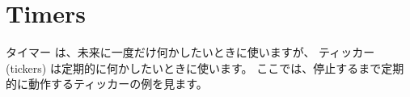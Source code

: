 \section{Timers}

タイマー は、未来に一度だけ何かしたいときに使いますが、 ティッカー (tickers) は定期的に何かしたいときに使います。 ここでは、停止するまで定期的に動作するティッカーの例を見ます。





